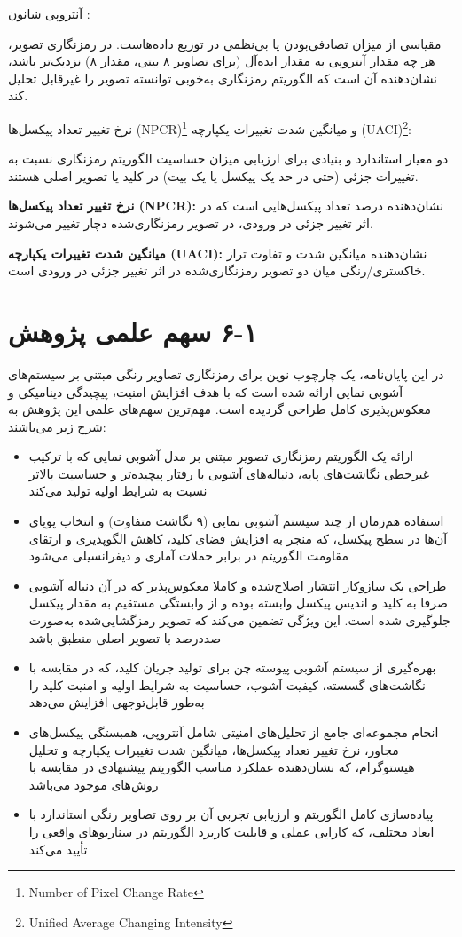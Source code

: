 آنتروپی شانون :

مقیاسی از میزان تصادفی‌بودن یا بی‌نظمی در توزیع داده‌هاست. در رمزنگاری تصویر، هر چه مقدار آنتروپی به مقدار ایده‌آل (برای تصاویر ۸ بیتی، مقدار ۸) نزدیک‌تر باشد، نشان‌دهنده آن است که الگوریتم رمزنگاری به‌خوبی توانسته تصویر را غیرقابل تحلیل کند.

نرخ تغییر تعداد پیکسل‌ها (NPCR)\footnote{Number of Pixel Change Rate} و میانگین شدت تغییرات یکپارچه (UACI)\footnote{Unified Average Changing Intensity}:

دو معیار استاندارد و بنیادی برای ارزیابی میزان حساسیت الگوریتم رمزنگاری نسبت به تغییرات جزئی (حتی در حد یک پیکسل یا یک بیت) در کلید یا تصویر اصلی هستند.

\textbf{نرخ تغییر تعداد پیکسل‌ها (NPCR):} نشان‌دهنده درصد تعداد پیکسل‌هایی است که در اثر تغییر جزئی در ورودی، در تصویر رمزنگاری‌شده دچار تغییر می‌شوند.

\textbf{میانگین شدت تغییرات یکپارچه (UACI):} نشان‌دهنده میانگین شدت و تفاوت تراز خاکستری/رنگی میان دو تصویر رمزنگاری‌شده در اثر تغییر جزئی در ورودی است.

\section{‏۱‏-‏۶‏ سهم علمی پژوهش}

در این پایان‌نامه، یک چارچوب نوین برای رمزنگاری تصاویر رنگی مبتنی بر سیستم‌های آشوبی نمایی ارائه شده است که با هدف افزایش امنیت، پیچیدگی دینامیکی و معکوس‌پذیری کامل طراحی گردیده است. مهم‌ترین سهم‌های علمی این پژوهش به شرح زیر می‌باشند:

\begin{itemize}
    \item ارائه یک الگوریتم رمزنگاری تصویر مبتنی بر مدل آشوبی نمایی که با ترکیب غیرخطی نگاشت‌های پایه، دنباله‌های آشوبی با رفتار پیچیده‌تر و حساسیت بالاتر نسبت به شرایط اولیه تولید می‌کند
    \item استفاده هم‌زمان از چند سیستم آشوبی نمایی (۹ نگاشت متفاوت) و انتخاب پویاى آن‌ها در سطح پیکسل، که منجر به افزایش فضای کلید، کاهش الگوپذیری و ارتقای مقاومت الگوریتم در برابر حملات آماری و دیفرانسیلی می‌شود
    \item طراحی یک سازوکار انتشار اصلاح‌شده و کاملا معکوس‌پذیر که در آن دنباله آشوبی صرفا به کلید و اندیس پیکسل وابسته بوده و از وابستگی مستقیم به مقدار پیکسل جلوگیری شده است. این ویژگی تضمین می‌کند که تصویر رمزگشایی‌شده به‌صورت صددرصد با تصویر اصلی منطبق باشد
    \item بهره‌گیری از سیستم آشوبی پیوسته چن برای تولید جریان کلید، که در مقایسه با نگاشت‌های گسسته، کیفیت آشوب، حساسیت به شرایط اولیه و امنیت کلید را به‌طور قابل‌توجهی افزایش می‌دهد
    \item انجام مجموعه‌ای جامع از تحلیل‌های امنیتی شامل آنتروپی، همبستگی پیکسل‌های مجاور، نرخ تغییر تعداد پیکسل‌ها، میانگین شدت تغییرات یکپارچه و تحلیل هیستوگرام، که نشان‌دهنده عملکرد مناسب الگوریتم پیشنهادی در مقایسه با روش‌های موجود می‌باشد
    \item پیاده‌سازی کامل الگوریتم و ارزیابی تجربی آن بر روی تصاویر رنگی استاندارد با ابعاد مختلف، که کارایی عملی و قابلیت کاربرد الگوریتم در سناریوهای واقعی را تأیید می‌کند
\end{itemize}

